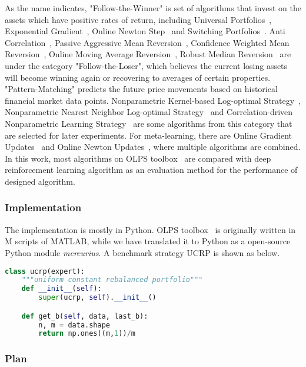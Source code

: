 As the name indicates, "Follow-the-Winner" is set of algorithms that invest on the assets which have positive rates of return, including Universal Portfolios~\cite{cover1991universal}, Exponential Gradient~\cite{helmbold1998line}, Online Newton Step~\cite{agarwal2006algorithms} and Switching Portfolios~\cite{singer1997switching}. Anti Correlation~\cite{borodin2004can}, Passive Aggressive Mean Reversion~\cite{li2012pamr}, Confidence Weighted Mean Reversion~\cite{li2013confidence}, Online Moving Average Reversion~\cite{li2015moving}, Robust Median Reversion~\cite{huang2013robust} are under the category "Follow-the-Loser", which believes the current losing assets will become winning again or recovering to averages of certain properties. "Pattern-Matching" predicts the future price movements based on historical financial market data points. Nonparametric Kernel-based Log-optimal Strategy~\cite{gyorfi2006nonparametric}, Nonparametric Nearest Neighbor Log-optimal Strategy~\cite{gyorfi2008nonparametric} and Correlation-driven Nonparametric Learning Strategy~\cite{li2011corn} are some algorithms from this category that are selected for later experiments. For meta-learning, there are Online Gradient Updates~\cite{das2011meta} and Online Newton Updates~\cite{das2011meta}, where multiple algorithms are combined. In this work, most algorithms on OLPS toolbox~\cite{JMLR:v17:15-317} are compared with deep reinforcement learning algorithm as an evaluation method for the performance of designed algorithm.


\subsubsection{Implementation}

The implementation is mostly in Python. OLPS toolbox~\cite{JMLR:v17:15-317} is originally written in M scripts of MATLAB, while we have translated it to Python as a open-source Python module \textit{mercurius}. A benchmark strategy UCRP is shown as below.

\begin{lstlisting}[language=Python, caption=Example Strategy]
class ucrp(expert):
    """uniform constant rebalanced portfolio"""
    def __init__(self):
        super(ucrp, self).__init__()

    def get_b(self, data, last_b):
        n, m = data.shape
        return np.ones((m,1))/m
\end{lstlisting}

\subsubsection{Plan}
\label{subsub: plan}


